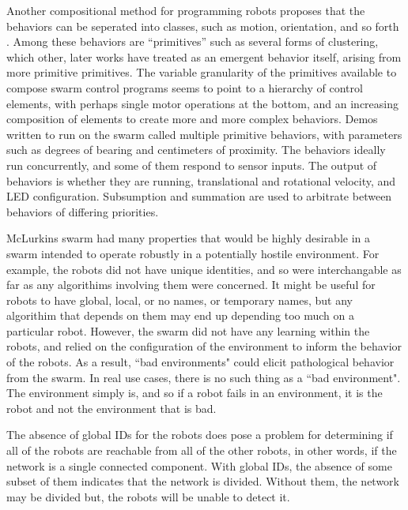 \documentclass[]{article}
\begin{document}
Another compositional method for programming robots proposes that the behaviors can be seperated into classes, such as motion, orientation, and so forth \cite{mclurkin2004stupid}. 
Among these behaviors are ``primitives'' such as several forms of clustering, which other, later works have treated as an emergent behavior itself, arising from more primitive primitives. 
The variable granularity of the primitives available to compose swarm control programs seems to point to a hierarchy of control elements, with perhaps single motor operations at the bottom, and an increasing composition of elements to create more and more complex behaviors.
Demos written to run on the swarm called multiple primitive behaviors, with parameters such as degrees of bearing and centimeters of proximity. 
The behaviors ideally run concurrently, and some of them respond to sensor inputs. 
The output of behaviors is whether they are running, translational and rotational velocity, and LED configuration. 
Subsumption and summation are used to arbitrate between behaviors of differing priorities. 

McLurkins swarm had many properties that would be highly desirable in a swarm intended to operate robustly in a potentially hostile environment. 
For example, the robots did not have unique identities, and so were interchangable as far as any algorithims involving them were concerned. 
It might be useful for robots to have global, local, or no names, or temporary names, but any algorithim that depends on them may end up depending too much on a particular robot. 
However, the swarm did not have any learning within the robots, and relied on the configuration of the environment to inform the behavior of the robots. 
As a result, ``bad environments" could elicit pathological behavior from the swarm. 
In real use cases, there is no such thing as a ``bad environment". 
The environment simply is, and so if a robot fails in an environment, it is the robot and not the environment that is bad. 

The absence of global IDs for the robots does pose a problem for determining if all of the robots are reachable from all of the other robots, in other words, if the network is a single connected component. 
With global IDs, the absence of some subset of them indicates that the network is divided. 
Without them, the network may be divided but, the robots will be unable to detect it. 
\end{document}
